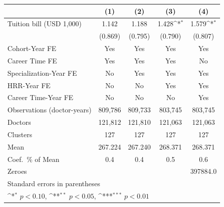 {
\def\sym#1{\ifmmode^{#1}\else\(^{#1}\)\fi}
\begin{tabular}{l*{4}{c}}
\hline\hline
                    &\multicolumn{1}{c}{(1)}         &\multicolumn{1}{c}{(2)}         &\multicolumn{1}{c}{(3)}         &\multicolumn{1}{c}{(4)}         \\
\hline
Tuition bill (USD 1,000)&       1.142         &       1.188         &       1.428\sym{*}  &       1.579\sym{*}  \\
                    &     (0.869)         &     (0.795)         &     (0.790)         &     (0.807)         \\
[1em]
Cohort-Year FE      &         Yes         &         Yes         &         Yes         &         Yes         \\
[1em]
Career Time FE      &         Yes         &         Yes         &         Yes         &          No         \\
[1em]
Specialization-Year FE&          No         &         Yes         &         Yes         &         Yes         \\
[1em]
HRR-Year FE         &          No         &          No         &         Yes         &         Yes         \\
[1em]
Career Time-Year FE &          No         &          No         &          No         &         Yes         \\
\hline
Observations (doctor-years)&     809,786         &     809,733         &     803,745         &     803,745         \\
Doctors             &     121,812         &     121,810         &     121,063         &     121,063         \\
Clusters            &         127         &         127         &         127         &         127         \\
Mean                &     267.224         &     267.240         &     268.371         &     268.371         \\
Coef.\ \% of Mean   &         0.4         &         0.4         &         0.5         &         0.6         \\
Zeroes              &                     &                     &                     &    397884.0         \\
\hline\hline
\multicolumn{5}{l}{\footnotesize Standard errors in parentheses}\\
\multicolumn{5}{l}{\footnotesize \sym{*} \(p<0.10\), \sym{**} \(p<0.05\), \sym{***} \(p<0.01\)}\\
\end{tabular}
}
